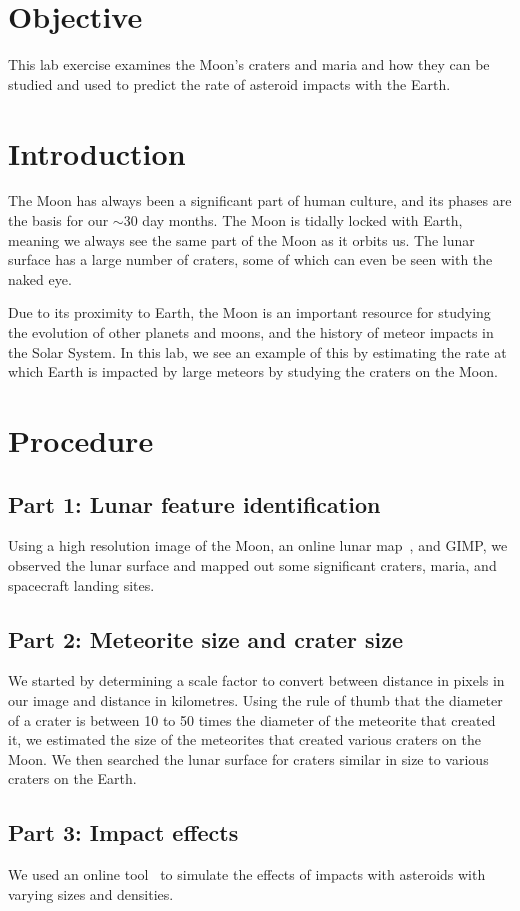 \documentclass[11pt]{article}
\begin{document}
\section{Objective}
This lab exercise examines the Moon's craters and maria and how they can be studied and used to predict the rate of asteroid impacts with the Earth.


\section{Introduction}
The Moon has always been a significant part of human culture, and its phases are the basis for our $\sim$30 day months.
The Moon is tidally locked with Earth, meaning we always see the same part of the Moon as it orbits us.
The lunar surface has a large number of craters, some of which can even be seen with the naked eye.

Due to its proximity to Earth, the Moon is an important resource for studying the evolution of other planets and moons, and the history of meteor impacts in the Solar System.
In this lab, we see an example of this by estimating the rate at which Earth is impacted by large meteors by studying the craters on the Moon.


\section{Procedure}
\subsection*{Part 1: Lunar feature identification}
Using a high resolution image of the Moon, an online lunar map~\cite{moon-map}, and GIMP, we observed the lunar surface and mapped out some significant craters, maria, and spacecraft landing sites.


\subsection*{Part 2: Meteorite size and crater size}
We started by determining a scale factor to convert between distance in pixels in our image and distance in kilometres.
Using the rule of thumb that the diameter of a crater is between 10 to 50 times the diameter of the meteorite that created it, we estimated the size of the meteorites that created various craters on the Moon.
We then searched the lunar surface for craters similar in size to various craters on the Earth.


\subsection*{Part 3: Impact effects}
We used an online tool~\cite{impact-simulator} to simulate the effects of impacts with asteroids with varying sizes and densities.
\end{document}
